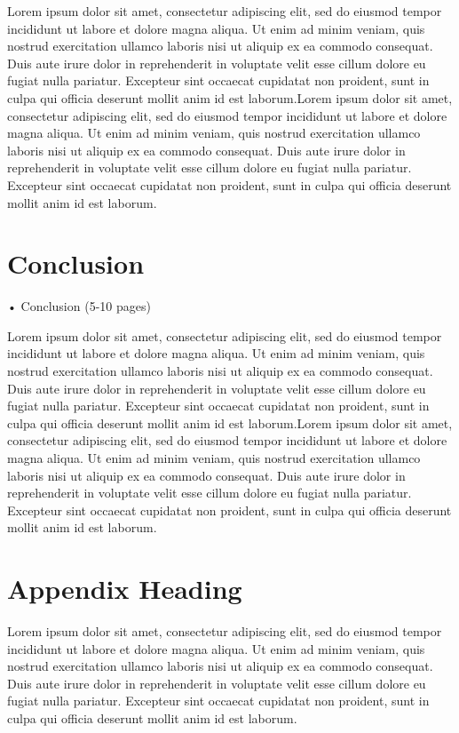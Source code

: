 \documentclass[12pt,a4 paper,openany,oneside, title page]{book}
\begin{document}
Lorem ipsum dolor sit amet, consectetur adipiscing elit, sed do eiusmod tempor incididunt ut labore et dolore magna aliqua. Ut enim ad minim veniam, quis nostrud exercitation ullamco laboris nisi ut aliquip ex ea commodo consequat. Duis aute irure dolor in reprehenderit in voluptate velit esse cillum dolore eu fugiat nulla pariatur. Excepteur sint occaecat cupidatat non proident, sunt in culpa qui officia deserunt mollit anim id est laborum.Lorem ipsum dolor sit amet, consectetur adipiscing elit, sed do eiusmod tempor incididunt ut labore et dolore magna aliqua. Ut enim ad minim veniam, quis nostrud exercitation ullamco laboris nisi ut aliquip ex ea commodo consequat. Duis aute irure dolor in reprehenderit in voluptate velit esse cillum dolore eu fugiat nulla pariatur. Excepteur sint occaecat cupidatat non proident, sunt in culpa qui officia deserunt mollit anim id est laborum.





\chapter{Conclusion}
• Conclusion (5-10 pages)


Lorem ipsum dolor sit amet, consectetur adipiscing elit, sed do eiusmod tempor incididunt ut labore et dolore magna aliqua. Ut enim ad minim veniam, quis nostrud exercitation ullamco laboris nisi ut aliquip ex ea commodo consequat. Duis aute irure dolor in reprehenderit in voluptate velit esse cillum dolore eu fugiat nulla pariatur. Excepteur sint occaecat cupidatat non proident, sunt in culpa qui officia deserunt mollit anim id est laborum.Lorem ipsum dolor sit amet, consectetur adipiscing elit, sed do eiusmod tempor incididunt ut labore et dolore magna aliqua. Ut enim ad minim veniam, quis nostrud exercitation ullamco laboris nisi ut aliquip ex ea commodo consequat. Duis aute irure dolor in reprehenderit in voluptate velit esse cillum dolore eu fugiat nulla pariatur. Excepteur sint occaecat cupidatat non proident, sunt in culpa qui officia deserunt mollit anim id est laborum.






\clearpage



\appendix
\chapter{Appendix Heading}

Lorem ipsum dolor sit amet, consectetur adipiscing elit, sed do eiusmod tempor incididunt ut labore et dolore magna aliqua. Ut enim ad minim veniam, quis nostrud exercitation ullamco laboris nisi ut aliquip ex ea commodo consequat. Duis aute irure dolor in reprehenderit in voluptate velit esse cillum dolore eu fugiat nulla pariatur. Excepteur sint occaecat cupidatat non proident, sunt in culpa qui officia deserunt mollit anim id est laborum.
\end{document}
